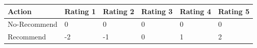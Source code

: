 \begin{tabular}{llllll}
\toprule
Action & Rating 1 & Rating 2 & Rating 3 & Rating 4 & Rating 5 \\
\midrule
No-Recommend & 0 & 0 & 0 & 0 & 0 \\
Recommend & -2 & -1 & 0 & 1 & 2 \\
\bottomrule
\end{tabular}
